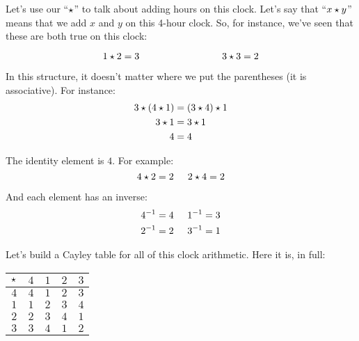 \documentclass[../../../main.tex]{subfiles}
\begin{document}
Let's use our ``$\opSymbol/$'' to talk about adding hours on this clock. Let's say that ``$\op{x}{y}$'' means that we add $x$ and $y$ on this 4-hour clock. So, for instance, we've seen that these are both true on this clock:

\begin{equation*}
   \op{1}{2} = 3 \hskip 3cm \op{3}{3} = 2
\end{equation*}


\begin{aside}
  \begin{remark}
    In this structure, it doesn't matter where we put the parentheses (it is associative). For instance:
    \begin{align*}
      \op{3}{(\op{4}{1})} &= \op{(\op{3}{4})}{1} \\
      \op{3}{1} &= \op{3}{1} \\
      4 &= 4
    \end{align*}
    
    The identity element is $4$. For example:
    \begin{equation*}
      \op{4}{2} = 2 \hskip 0.5cm \op{2}{4} = 2
    \end{equation*}
    
    And each element has an inverse:
    \begin{align*}
      4^{-1} = 4 \hskip 0.5cm
      1^{-1} = 3 \\
      2^{-1} = 2 \hskip 0.5cm
      3^{-1} = 1
    \end{align*}
  \end{remark}
\end{aside}

Let's build a Cayley table for all of this clock arithmetic. Here it is, in full:

\begin{center}
  \begin{tabular}{| c || c | c | c | c |}
    \hline
    $\opSymbol/$ & $4$ & $1$ & $2$ & $3$ \\ \hline \hline
    $4$          & $4$ & $1$ & $2$ & $3$ \\ \hline
    $1$          & $1$ & $2$ & $3$ & $4$ \\ \hline
    $2$          & $2$ & $3$ & $4$ & $1$ \\ \hline
    $3$          & $3$ & $4$ & $1$ & $2$ \\ \hline
  \end{tabular}
\end{center}
\end{document}

